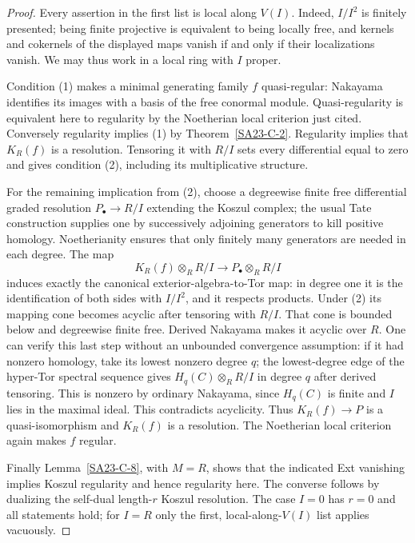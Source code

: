 \begin{proof}
Every assertion in the first list is local along $V(I)$.  Indeed,
$I/I^2$ is finitely presented; being finite projective is equivalent
to being locally free, and kernels and cokernels of the displayed
maps vanish if and only if their localizations vanish.  We may thus
work in a local ring with $I$ proper.

Condition (1) makes a minimal generating family $f$ quasi-regular:
Nakayama identifies its images with a basis of the free conormal
module.  Quasi-regularity is equivalent here to regularity by the
Noetherian local criterion just cited.  Conversely regularity implies
(1) by Theorem~\ref{SA23-C-2}.  Regularity implies that $K_R(f)$ is a
resolution.  Tensoring it with $R/I$ sets every differential equal to
zero and gives condition (2), including its multiplicative structure.

For the remaining implication from (2), choose a degreewise finite
free differential graded resolution $P_\bullet\to R/I$ extending
the Koszul complex; the usual Tate construction supplies one by
successively adjoining generators to kill positive homology.
Noetherianity ensures that only finitely many generators are needed
in each degree.  The map
\[
 K_R(f)\otimes_R R/I\longrightarrow P_\bullet\otimes_R R/I
\]
induces exactly the canonical exterior-algebra-to-Tor map: in degree
one it is the identification of both sides with $I/I^2$, and it
respects products.  Under (2) its mapping cone becomes acyclic after
tensoring with $R/I$.  That cone is bounded below and degreewise
finite free.  Derived Nakayama makes it acyclic over $R$.  One can
verify this last step without an unbounded convergence assumption:
if it had nonzero homology, take its lowest nonzero degree $q$;
the lowest-degree edge of the hyper-Tor spectral sequence gives
$H_q(C)\otimes_R R/I$ in degree $q$ after derived tensoring.
This is nonzero by ordinary Nakayama, since $H_q(C)$ is finite and
$I$ lies in the maximal ideal.  This contradicts acyclicity.
Thus $K_R(f)\to P$ is a quasi-isomorphism and $K_R(f)$ is a resolution.
The Noetherian local criterion again makes $f$ regular.

Finally Lemma~\ref{SA23-C-8}, with $M=R$, shows that the indicated
Ext vanishing implies Koszul regularity and hence regularity here.
The converse follows by dualizing the self-dual length-$r$ Koszul
resolution.  The case $I=0$ has $r=0$ and all statements hold; for
$I=R$ only the first, local-along-$V(I)$ list applies vacuously.
\end{proof}

